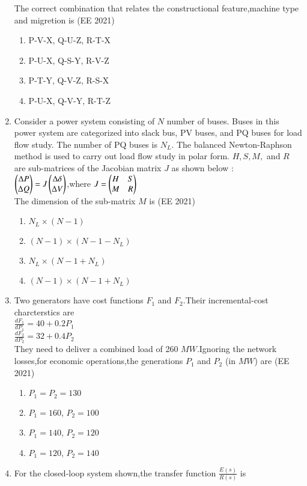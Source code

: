 \documentclass[journal,12pt,onecolumn]{IEEEtran}
\theoremstyle{remark}
\begin{document}
\begin{enumerate}
The correct combination that relates the constructional feature,machine type and migretion is
\hfill{(EE 2021)}
\begin{enumerate}
\item P-V-X, Q-U-Z, R-T-X
\item P-U-X, Q-S-Y, R-V-Z
\item P-T-Y, Q-V-Z, R-S-X
\item P-U-X, Q-V-Y, R-T-Z
\end{enumerate}
\item Consider a power system consisting of $N$ number of buses. Buses in this power system are categorized into slack bus, PV buses, and PQ buses for load flow study. The number of PQ buses is $N_L$. The balanced Newton-Raphson method is used to carry out load flow study in polar form. $H,S,M,$ and $R$ are sub-matrices of the Jacobian matrix $J$ as shown below :\\
$\begin{pmatrix}\Delta{P} \\ \Delta{Q}\end{pmatrix} =J\begin{pmatrix}\Delta{\delta} \\ \Delta{V}\end{pmatrix}$,where $J=\begin{pmatrix}H & S \\ M&R\end{pmatrix}$ \\
The dimension of the sub-matrix $M$ is
\hfill{(EE 2021)}
\begin{enumerate}
\item $N_L\times(N-1)$
\item $(N-1)\times(N-1-N_L)$
\item $N_L\times(N-1+N_L)$
\item $(N-1)\times(N-1+N_L)$
\end{enumerate}
\item Two generators have cost functions $F_1$ and $F_2$.Their incremental-cost charcterstics are \\
$\frac{dF_1}{dP_1} = 40 + 0.2P_1$ \\
$\frac{dF_2}{dP_2} = 32 + 0.4P_2$ \\
They need to deliver a combined load of 260 $MW$.Ignoring the network losses,for economic operations,the generations $P_1$ and $P_2$ (in $MW$) are
\hfill{(EE 2021)}
\begin{enumerate}
\item $P_1 = P_2 = 130$
\item $P_1=160$, $P_2=100$
\item $P_1=140$, $P_2=120$
\item $P_1=120$, $P_2=140$
\end{enumerate}
\item For the closed-loop system shown,the transfer function $\frac{E(s)}{R(s)}$ is 

\end{enumerate}
\end{document}
